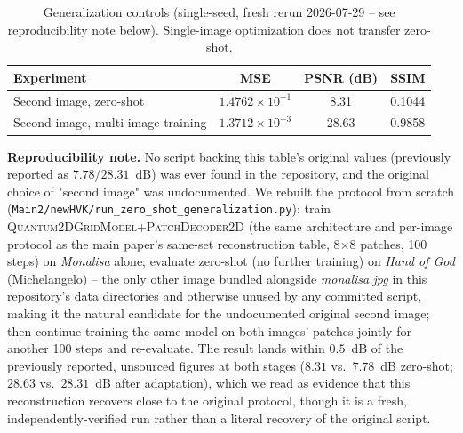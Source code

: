 \documentclass[11pt]{article}
\begin{document}
\begin{table}[H]
\centering
\caption{Generalization controls (single-seed, fresh rerun 2026-07-29 -- see reproducibility note below). Single-image optimization does not transfer zero-shot.}
\label{tab:generalization_controls}
\scriptsize
\begin{tabular}{lccc}
\toprule
Experiment & MSE & PSNR (dB) & SSIM \\
\midrule
Second image, zero-shot & $1.4762\times10^{-1}$ & 8.31 & 0.1044 \\
Second image, multi-image training & $1.3712\times10^{-3}$ & 28.63 & 0.9858 \\
\bottomrule
\end{tabular}
\end{table}

\textbf{Reproducibility note.} No script backing this table's original values (previously reported as $7.78$/$28.31$~dB) was ever found in the repository, and the original choice of "second image" was undocumented. We rebuilt the protocol from scratch (\texttt{Main2/newHVK/run\_zero\_shot\_generalization.py}): train \textsc{Quantum2DGridModel}+\textsc{PatchDecoder2D} (the same architecture and per-image protocol as the main paper's same-set reconstruction table, 8$\times$8 patches, 100 steps) on \textit{Monalisa} alone; evaluate zero-shot (no further training) on \textit{Hand of God} (Michelangelo) -- the only other image bundled alongside \textit{monalisa.jpg} in this repository's data directories and otherwise unused by any committed script, making it the natural candidate for the undocumented original second image; then continue training the same model on both images' patches jointly for another 100 steps and re-evaluate. The result lands within $0.5$~dB of the previously reported, unsourced figures at both stages ($8.31$ vs.\ $7.78$~dB zero-shot; $28.63$ vs.\ $28.31$~dB after adaptation), which we read as evidence that this reconstruction recovers close to the original protocol, though it is a fresh, independently-verified run rather than a literal recovery of the original script.
\end{document}
